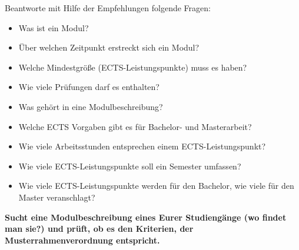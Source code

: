 \documentclass{scrartcl}
\begin{document}
Beantworte mit Hilfe der Empfehlungen folgende Fragen:
\begin{itemize}
	\item Was ist ein Modul?
	\item Über welchen Zeitpunkt erstreckt sich ein Modul?
	\item Welche Mindestgröße (ECTS-Leistungspunkte) muss es haben?
	\item Wie viele Prüfungen darf es enthalten?
	\item Was gehört in eine Modulbeschreibung?
	\item Welche ECTS Vorgaben gibt es für Bachelor- und Masterarbeit?
	\item Wie viele Arbeitsstunden entsprechen einem ECTS-Leistungspunkt?
	\item Wie viele ECTS-Leistungspunkte soll ein Semester umfassen?
	\item Wie viele ECTS-Leistungspunkte werden für den Bachelor, wie viele für den Master veranschlagt?
	\end{itemize}
	
\textbf{Sucht eine Modulbeschreibung eines Eurer Studiengänge (wo findet man sie?) und prüft, ob es den Kriterien, der Musterrahmenverordnung entspricht.}
\end{document}

